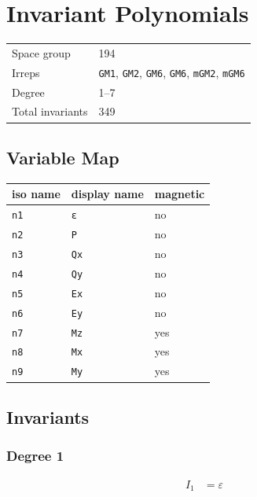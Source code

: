 \documentclass{article}
\begin{document}
\section*{Invariant Polynomials}

\begin{tabular}{ll}
\toprule
Space group & 194 \\
Irreps & \texttt{GM1\textplus{}}, \texttt{GM2\textminus{}}, \texttt{GM6\textminus{}}, \texttt{GM6\textminus{}}, \texttt{mGM2\textplus{}}, \texttt{mGM6\textplus{}} \\
Degree & 1--7 \\
Total invariants & 349 \\
\bottomrule
\end{tabular}

\subsection*{Variable Map}

\begin{tabular}{lll}
\toprule
iso name & display name & magnetic \\
\midrule
\texttt{n1} & \texttt{ε} & no \\
\texttt{n2} & \texttt{P} & no \\
\texttt{n3} & \texttt{Qx} & no \\
\texttt{n4} & \texttt{Qy} & no \\
\texttt{n5} & \texttt{Ex} & no \\
\texttt{n6} & \texttt{Ey} & no \\
\texttt{n7} & \texttt{Mz} & yes \\
\texttt{n8} & \texttt{Mx} & yes \\
\texttt{n9} & \texttt{My} & yes \\
\bottomrule
\end{tabular}

\subsection*{Invariants}

\subsubsection*{Degree 1}

\begin{align*}
I_{1} &= ε \\
\end{align*}
\end{document}
